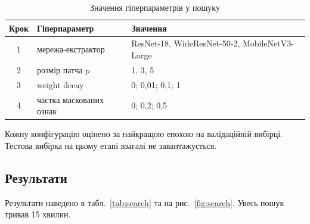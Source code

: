 \documentclass[14pt,a4paper]{extreport}
\begin{document}
\begin{table}[H]
\caption{Значення гіперпараметрів у пошуку}
\label{tab:space}
\begin{tabularx}{\linewidth}{|c|X|X|}
\hline
\textbf{Крок} & \textbf{Гіперпараметр} & \textbf{Значення} \\
\hline
1 & мережа-екстрактор & ResNet-18, WideResNet-50-2, MobileNetV3-Large \\
\hline
2 & розмір патча $p$ & 1, 3, 5 \\
\hline
3 & weight decay & 0; 0,01; 0,1; 1 \\
\hline
4 & частка маскованих ознак & 0; 0,2; 0,5 \\
\hline
\end{tabularx}
\end{table}

Кожну конфігурацію оцінено за найкращою епохою на валідаційній вибірці. Тестова вибірка на цьому етапі взагалі не завантажується.

\subsection{Результати}

Результати наведено в табл.~\ref{tab:search} та на рис.~\ref{fig:search}. Увесь пошук тривав 15 хвилин.
\end{document}
